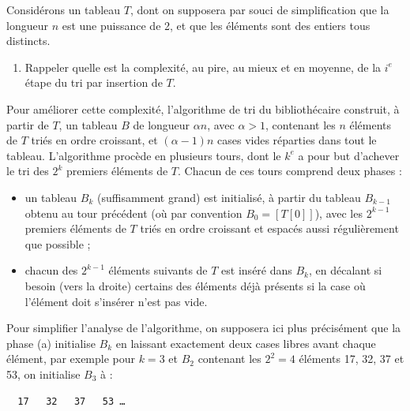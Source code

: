 \documentclass{article}
\begin{document}
Considérons un tableau $T$, dont on supposera par souci de simplification que la longueur $n$ est une puissance de 2, et que les éléments sont des entiers tous distincts.

\begin{enumerate}
    \item Rappeler quelle est la complexité, au pire, au mieux et en moyenne, de la $i^e$ étape du tri par insertion de $T$.
\end{enumerate}

Pour améliorer cette complexité, l'algorithme de tri du bibliothécaire construit, à partir de $T$, un tableau $B$ de longueur $\alpha n$, avec $\alpha > 1$, contenant les $n$ éléments de $T$ triés en ordre croissant, et $(\alpha-1)n$ cases vides réparties dans tout le tableau. L'algorithme procède en plusieurs tours, dont le $k^e$ a pour but d'achever le tri des $2^k$ premiers éléments de $T$. Chacun de ces tours comprend deux phases :
\begin{itemize}
    \item[(a)] un tableau $B_k$ (suffisamment grand) est initialisé, à partir du tableau $B_{k-1}$ obtenu au tour précédent (où par convention $B_0 = [T[0]]$), avec les $2^{k-1}$ premiers éléments de $T$ triés en ordre croissant et espacés aussi régulièrement que possible ;
    \item[(b)] chacun des $2^{k-1}$ éléments suivants de $T$ est inséré dans $B_k$, en décalant si besoin (vers la droite) certains des éléments déjà présents si la case où l'élément doit s'insérer n'est pas vide.
\end{itemize}

Pour simplifier l'analyse de l'algorithme, on supposera ici plus précisément que la phase (a) initialise $B_k$ en laissant exactement deux cases libres avant chaque élément, par exemple pour $k=3$ et $B_2$ contenant les $2^2=4$ éléments 17, 32, 37 et 53, on initialise $B_3$ à :

\begin{center}
    \texttt{\underline{\quad} \underline{\quad} 17 \underline{\quad} \underline{\quad} 32 \underline{\quad} \underline{\quad} 37 \underline{\quad} \underline{\quad} 53 \ldots}
\end{center}
\end{document}
